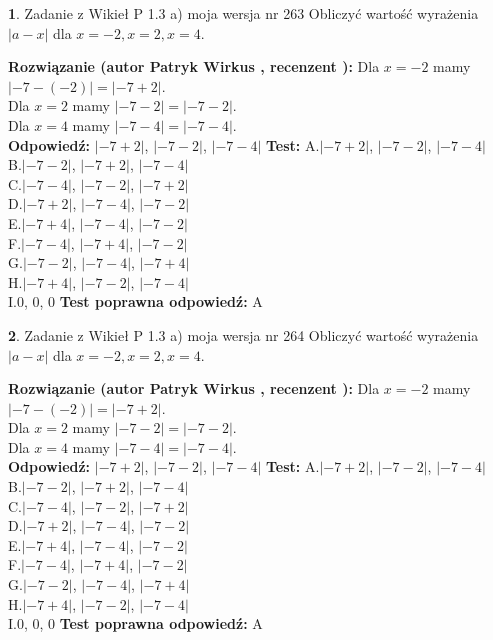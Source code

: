 \documentclass[12pt, a4paper]{article}
\theoremstyle{definition} %
\newtheorem{zad}{}
\newcommand{\zadStart}[1]{\begin{zad}#1\newline}
\newcommand{\zadStop}{\end{zad}}
\newcommand{\rozwStart}[2]{\noindent \textbf{Rozwiązanie (autor #1 , recenzent #2): }\newline}
\newcommand{\rozwStop}{\newline}
\newcommand{\odpStart}{\noindent \textbf{Odpowiedź:}\newline}
\newcommand{\odpStop}{\newline}
\newcommand{\testStart}{\noindent \textbf{Test:}\newline}
\newcommand{\testStop}{\newline}
\newcommand{\kluczStart}{\noindent \textbf{Test poprawna odpowiedź:}\newline}
\newcommand{\kluczStop}{\newline}
\begin{document}
\zadStart{Zadanie z Wikieł P 1.3 a) moja wersja nr 263}
Obliczyć wartość wyrażenia $|a - x|$ dla $x=-2,x=2,x=4$.
\zadStop
\rozwStart{Patryk Wirkus}{}
Dla $x = -2$ mamy $|-7 - (-2)| = |-7 + 2|$.\\
Dla $x = 2$ mamy $|-7 - 2| = |-7 - 2|$.\\
Dla $x = 4$ mamy $|-7 - 4| = |-7 - 4|$.\\
\rozwStop
\odpStart
$|-7 + 2|$, $|-7 - 2|$, $|-7 - 4|$
\odpStop
\testStart
A.$|-7 + 2|$, $|-7 - 2|$, $|-7 - 4|$\\
B.$|-7 - 2|$, $|-7 + 2|$, $|-7 - 4|$\\
C.$|-7 - 4|$, $|-7 - 2|$, $|-7 + 2|$\\
D.$|-7 + 2|$, $|-7 - 4|$, $|-7 - 2|$\\
E.$|-7 + 4|$, $|-7 - 4|$, $|-7 - 2|$\\
F.$|-7 - 4|$, $|-7 + 4|$, $|-7 - 2|$\\
G.$|-7 - 2|$, $|-7 - 4|$, $|-7 + 4|$\\
H.$|-7 + 4|$, $|-7 - 2|$, $|-7 - 4|$\\
I.$0$, $0$, $0$
\testStop
\kluczStart
A
\kluczStop



\zadStart{Zadanie z Wikieł P 1.3 a) moja wersja nr 264}
Obliczyć wartość wyrażenia $|a - x|$ dla $x=-2,x=2,x=4$.
\zadStop
\rozwStart{Patryk Wirkus}{}
Dla $x = -2$ mamy $|-7 - (-2)| = |-7 + 2|$.\\
Dla $x = 2$ mamy $|-7 - 2| = |-7 - 2|$.\\
Dla $x = 4$ mamy $|-7 - 4| = |-7 - 4|$.\\
\rozwStop
\odpStart
$|-7 + 2|$, $|-7 - 2|$, $|-7 - 4|$
\odpStop
\testStart
A.$|-7 + 2|$, $|-7 - 2|$, $|-7 - 4|$\\
B.$|-7 - 2|$, $|-7 + 2|$, $|-7 - 4|$\\
C.$|-7 - 4|$, $|-7 - 2|$, $|-7 + 2|$\\
D.$|-7 + 2|$, $|-7 - 4|$, $|-7 - 2|$\\
E.$|-7 + 4|$, $|-7 - 4|$, $|-7 - 2|$\\
F.$|-7 - 4|$, $|-7 + 4|$, $|-7 - 2|$\\
G.$|-7 - 2|$, $|-7 - 4|$, $|-7 + 4|$\\
H.$|-7 + 4|$, $|-7 - 2|$, $|-7 - 4|$\\
I.$0$, $0$, $0$
\testStop
\kluczStart
A
\kluczStop
\end{document}
